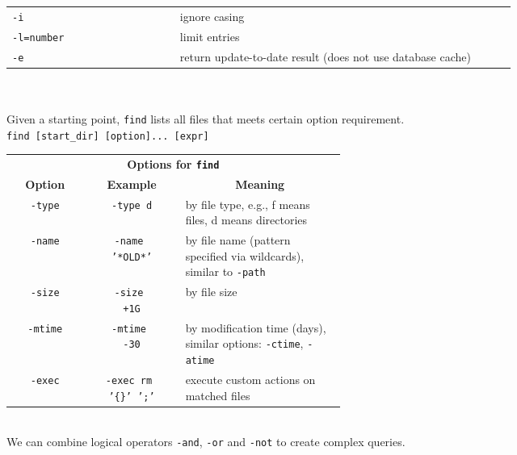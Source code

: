 \documentclass[landscape,a0paper,fontscale=0.285]{baposter} %
\begin{document}
\begin{poster}
{\begin{tabular}{p{0.3 \linewidth}p{0.6\linewidth}}
\texttt{\small{-i}} & ignore casing \\
\texttt{\small{-l=number}} & limit entries \\
\texttt{\small{-e}} & return update-to-date result (does not use database cache) \\
\end{tabular}\\

 \\
Given a starting point, \texttt{\small{find}} lists all files that meets certain option requirement. \\

\texttt{\small{find [start\_dir] [option]... [expr]}} \\

\begin{tabular}{ccp{0.48\linewidth}}
\multicolumn{3}{c}{\textbf{Options for \texttt{\small{find}}}} \\
\multicolumn{1}{c}{\textbf{Option}} &
\multicolumn{1}{c}{\textbf{Example}} &
\multicolumn{1}{c}{\textbf{Meaning}} \\
\texttt{\small{-type}} & \texttt{\small{-type d}} & by file type, e.g., f means files, d means directories \\
\texttt{\small{-name}} & \makecell{\small{\texttt{-name }} \\ \texttt{\small{'*OLD*'}}} & by file name (pattern specified via wildcards), similar to \texttt{\small{-path}}\\
\texttt{\small{-size}} & \makecell{\small{\texttt{-size }}\\ \texttt{+1G}} & by file size \\
\texttt{\small{-mtime}} & \makecell{\small{\texttt{-mtime }}\\ \texttt{-30}} & by modification time (days), similar options: \texttt{\small{-ctime}}, \texttt{\small{-atime}} \\
\texttt{\small{-exec}} & \makecell{\small{\texttt{-exec rm }\\\texttt{'\{\}' ';'}}}  & execute custom actions on matched files
\end{tabular}\\

We can combine logical operators \texttt{\small{-and}}, \texttt{\small{-or}} and \texttt{\small{-not}} to create complex queries. \\

}
\end{poster}
\end{document}
